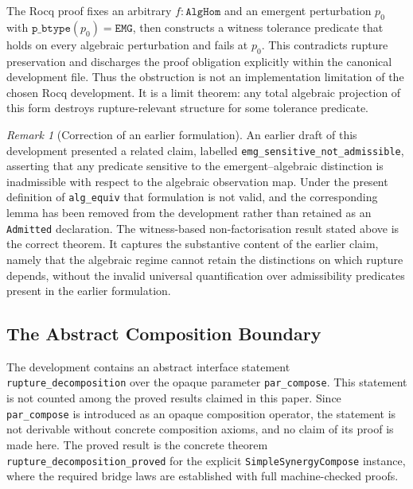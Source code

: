 \documentclass[pdflatex,sn-mathphys-num]{sn-jnl}
\theoremstyle{plain}
\theoremstyle{definition}
\theoremstyle{remark}
\newtheorem{remark}[theorem]{Remark}
\begin{document}
The Rocq proof fixes an arbitrary $f : \mathtt{AlgHom}$ and an
emergent perturbation $p_0$ with
$\mathtt{p\_btype}(p_0) = \mathtt{EMG}$, then constructs a witness
tolerance predicate that holds on every algebraic perturbation and
fails at $p_0$.
This contradicts rupture preservation and discharges the proof
obligation explicitly within the canonical development file.
Thus the obstruction is not an implementation limitation of the chosen
Rocq development.
It is a limit theorem: any total algebraic projection of this form
destroys rupture-relevant structure for some tolerance predicate.

\begin{remark}[Correction of an earlier formulation]
\label{rem:emg-correction}
An earlier draft of this development presented a related claim,
labelled \texttt{emg\_sensitive\_not\_admissible}, asserting that any
predicate sensitive to the emergent--algebraic distinction is
inadmissible with respect to the algebraic observation map.
Under the present definition of \texttt{alg\_equiv} that formulation
is not valid, and the corresponding lemma has been removed from
the development rather than retained as an \texttt{Admitted}
declaration.
The witness-based non-factorisation result stated above is the correct
theorem.
It captures the substantive content of the earlier claim, namely that
the algebraic regime cannot retain the distinctions on which rupture
depends, without the invalid universal quantification over admissibility
predicates present in the earlier formulation.
\end{remark}

\subsection{The Abstract Composition Boundary}

The development contains an abstract interface statement
\texttt{rupture\_decomposition} over the opaque parameter
\texttt{par\_compose}.
This statement is not counted among the proved results claimed in this
paper.
Since \texttt{par\_compose} is introduced as an opaque composition
operator, the statement is not derivable without concrete composition
axioms, and no claim of its proof is made here.
The proved result is the concrete theorem
\texttt{rupture\_decomposition\_proved} for the explicit
\texttt{SimpleSynergyCompose} instance, where the required bridge laws
are established with full machine-checked proofs.
\end{document}
